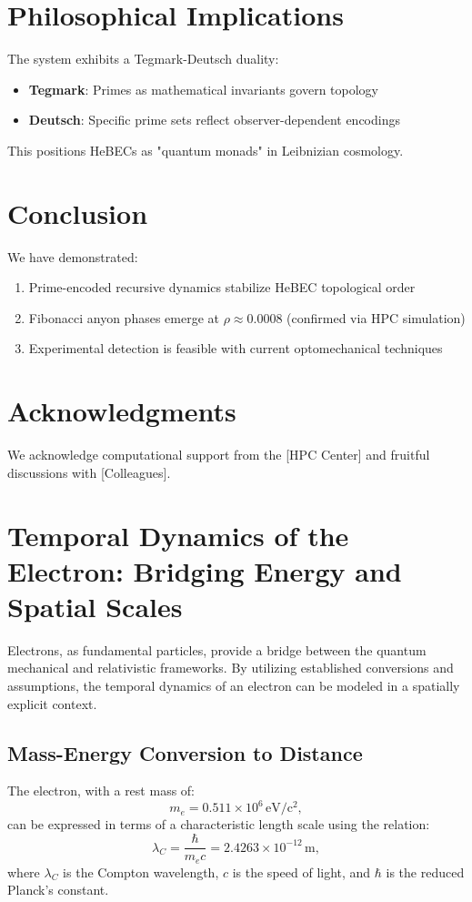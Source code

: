 \documentclass{article}
\theoremstyle{plain}
\begin{document}
\section{Philosophical Implications}
The system exhibits a Tegmark-Deutsch duality:
\begin{itemize}
\item \textbf{Tegmark}: Primes as mathematical invariants govern topology
\item \textbf{Deutsch}: Specific prime sets reflect observer-dependent encodings
\end{itemize}
This positions HeBECs as "quantum monads" in Leibnizian cosmology.

\section{Conclusion}
We have demonstrated:
\begin{enumerate}
\item Prime-encoded recursive dynamics stabilize HeBEC topological order
\item Fibonacci anyon phases emerge at $\rho \approx 0.0008$ (confirmed via HPC simulation)
\item Experimental detection is feasible with current optomechanical techniques
\end{enumerate}

\section*{Acknowledgments}
We acknowledge computational support from the [HPC Center] and fruitful discussions with [Colleagues].

\section{Temporal Dynamics of the Electron: Bridging Energy and Spatial Scales}

Electrons, as fundamental particles, provide a bridge between the quantum mechanical and relativistic frameworks. By utilizing established conversions and assumptions, the temporal dynamics of an electron can be modeled in a spatially explicit context.

\subsection{Mass-Energy Conversion to Distance}
The electron, with a rest mass of:
\[
m_e = 0.511 \times 10^6 \, \mathrm{eV/c^2},
\]
can be expressed in terms of a characteristic length scale using the relation:
\[
\lambda_C = \frac{\hbar}{m_e c} = 2.4263 \times 10^{-12} \, \mathrm{m},
\]
where $\lambda_C$ is the Compton wavelength, $c$ is the speed of light, and $\hbar$ is the reduced Planck's constant.
\end{document}
